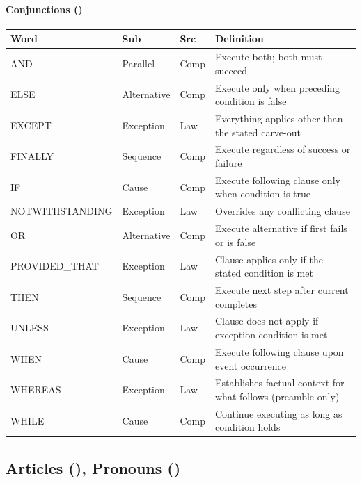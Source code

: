 \documentclass{article}
\begin{document}
\paragraph{Conjunctions (\VocabConjunctions)}
\small
\begin{tabular}{lllp{7cm}}
\toprule \textbf{Word} & \textbf{Sub} & \textbf{Src} & \textbf{Definition} \\ \midrule
AND & Parallel & Comp & Execute both; both must succeed \\
ELSE & Alternative & Comp & Execute only when preceding condition is false \\
EXCEPT & Exception & Law & Everything applies other than the stated carve-out \\
FINALLY & Sequence & Comp & Execute regardless of success or failure \\
IF & Cause & Comp & Execute following clause only when condition is true \\
NOTWITHSTANDING & Exception & Law & Overrides any conflicting clause \\
OR & Alternative & Comp & Execute alternative if first fails or is false \\
PROVIDED\_THAT & Exception & Law & Clause applies only if the stated condition is met \\
THEN & Sequence & Comp & Execute next step after current completes \\
UNLESS & Exception & Law & Clause does not apply if exception condition is met \\
WHEN & Cause & Comp & Execute following clause upon event occurrence \\
WHEREAS & Exception & Law & Establishes factual context for what follows (preamble only) \\
WHILE & Cause & Comp & Continue executing as long as condition holds \\
\bottomrule
\end{tabular}
\normalsize

\subsection{Articles (\VocabArticles), Pronouns (\VocabPronouns)}
\end{document}
